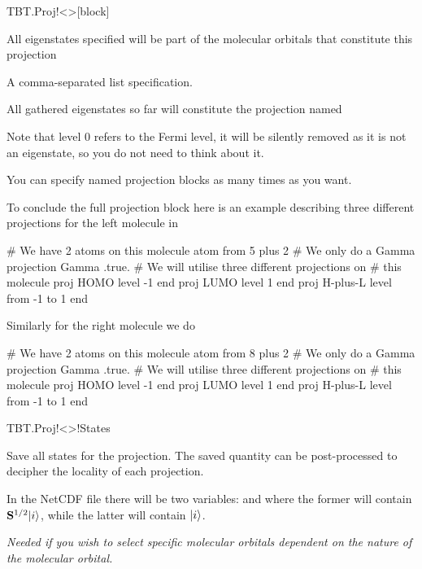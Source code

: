 \begin{fdfentry}{TBT.Proj!<>}[block]
\begin{fdfoptions}
\begin{fdfoptions}
      \option[level <E1> <E2> ... <En>] %
      All eigenstates specified will be part of the molecular orbitals
      that constitute this projection

      \option[level {[ <list> ]}] %
      A comma-separated list specification.

      \option[end] %
      All gathered eigenstates so far will constitute the projection
      named 
      
    \end{fdfoptions}

    Note that level $0$ refers to the Fermi level, it will be silently
    removed as it is not an eigenstate, so you do not need to think
    about it.

    You can specify named projection blocks as many times as you want.

    To conclude the full projection block here is an example
    describing three different projections for the left molecule in
    \begin{fdfexample}
   # We have 2 atoms on this molecule
   atom from 5 plus 2
   # We only do a Gamma projection
   Gamma .true.
   # We will utilise three different projections on 
   # this molecule
   proj HOMO
    level -1
   end 
   proj LUMO
    level 1
   end
   proj H-plus-L
    level from -1 to 1
   end
    \end{fdfexample}

    Similarly for the right molecule we do
    \begin{fdfexample}
   # We have 2 atoms on this molecule
   atom from 8 plus 2
   # We only do a Gamma projection
   Gamma .true.
   # We will utilise three different projections on 
   # this molecule
   proj HOMO
    level -1
   end 
   proj LUMO
    level 1
   end
   proj H-plus-L
    level from -1 to 1
   end
    \end{fdfexample}
   
  \end{fdfoptions}
 
\end{fdfentry}


\begin{fdflogicalF}{TBT.Proj!<>!States}%

  Save all states for the projection. The saved quantity can be
  post-processed to decipher the locality of each projection.

  In the NetCDF file there will be two variables:  and
   where the former will contain $\mathbf{S}^{1/2}|i\rangle$,
  while the latter will contain $|i\rangle$.

  \emph{Needed if you wish to select specific molecular orbitals
      dependent on the nature of the molecular orbital.}
  
\end{fdflogicalF}



